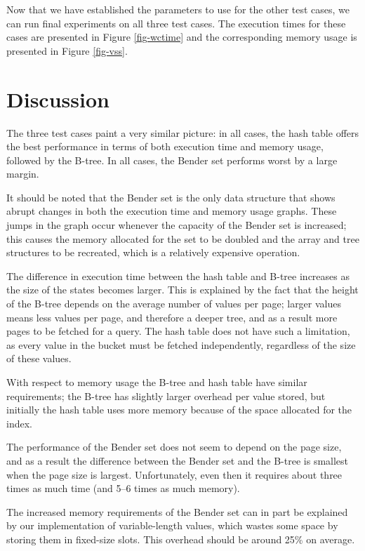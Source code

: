 \documentclass{acm_proc_article-sp}
\begin{document}
Now that we have established the parameters to use for the other test cases,
we can run final experiments on all three test cases.
The execution times for these cases are presented in Figure \ref{fig-wctime}
and the corresponding memory usage is presented in Figure \ref{fig-vss}.

\section{Discussion}
The three test cases paint a very similar picture: in all cases, the hash table
offers the best performance in terms of both execution time and memory usage,
followed by the B-tree. In all cases, the Bender set performs worst by a large
margin.

It should be noted that the Bender set is the only data structure that shows
abrupt changes in both the execution time and memory usage graphs. These
jumps in the graph occur whenever the capacity of the Bender set is increased;
this causes the memory allocated for the set to be doubled and the array and
tree structures to be recreated, which is a relatively expensive operation.

The difference in execution time between the hash table and B-tree increases as
the size of the states becomes larger. This is explained by the fact that the
height of the B-tree depends on the average number of values per page; larger
values means less values per page, and therefore a deeper tree, and as a
result more pages to be fetched for a query. The hash table does not have such a
limitation, as every value in the bucket must be fetched independently, regardless
of the size of these values.

With respect to memory usage the B-tree and hash table have similar requirements;
the B-tree has slightly larger overhead per value stored, but initially the hash
table uses more memory because of the space allocated for the index.

The performance of the Bender set does not seem to depend on the page size,
and as a result the difference between the Bender set and the B-tree is smallest
when the page size is largest. Unfortunately, even then it requires about three
times as much time (and 5--6 times as much memory).

The increased memory requirements of the Bender set can in part be explained by
our implementation of variable-length values, which wastes some space by storing
them in fixed-size slots. This overhead should be around 25\% on average.
\end{document}
